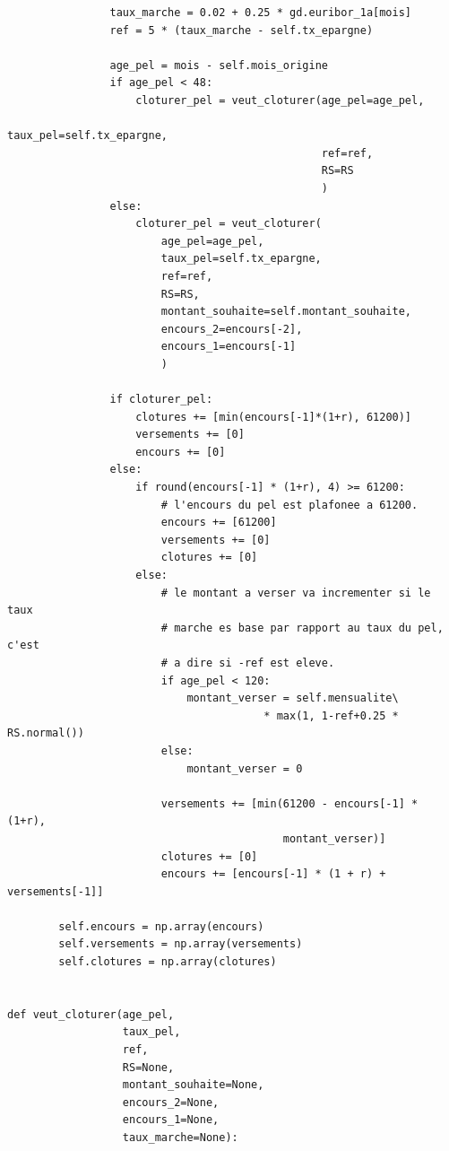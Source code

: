 \documentclass[12pt, a4paper]{book}
\begin{document}
{\begin{small}
\begin{verbatim}
                taux_marche = 0.02 + 0.25 * gd.euribor_1a[mois]
                ref = 5 * (taux_marche - self.tx_epargne)

                age_pel = mois - self.mois_origine
                if age_pel < 48:
                    cloturer_pel = veut_cloturer(age_pel=age_pel,
                                                 taux_pel=self.tx_epargne,
                                                 ref=ref,
                                                 RS=RS
                                                 )
                else:
                    cloturer_pel = veut_cloturer(
                        age_pel=age_pel,
                        taux_pel=self.tx_epargne,
                        ref=ref,
                        RS=RS,
                        montant_souhaite=self.montant_souhaite,
                        encours_2=encours[-2],
                        encours_1=encours[-1]
                        )

                if cloturer_pel:
                    clotures += [min(encours[-1]*(1+r), 61200)]
                    versements += [0]
                    encours += [0]
                else:
                    if round(encours[-1] * (1+r), 4) >= 61200:
                        # l'encours du pel est plafonee a 61200.
                        encours += [61200]
                        versements += [0]
                        clotures += [0]
                    else:
                        # le montant a verser va incrementer si le taux
                        # marche es base par rapport au taux du pel, c'est
                        # a dire si -ref est eleve.
                        if age_pel < 120:
                            montant_verser = self.mensualite\
                                        * max(1, 1-ref+0.25 * RS.normal())
                        else:
                            montant_verser = 0

                        versements += [min(61200 - encours[-1] * (1+r),
                                           montant_verser)]
                        clotures += [0]
                        encours += [encours[-1] * (1 + r) + versements[-1]]

        self.encours = np.array(encours)
        self.versements = np.array(versements)
        self.clotures = np.array(clotures)


def veut_cloturer(age_pel,
                  taux_pel,
                  ref,
                  RS=None,
                  montant_souhaite=None,
                  encours_2=None,
                  encours_1=None,
                  taux_marche=None):


\end{verbatim}
\end{small}}
\end{document}
